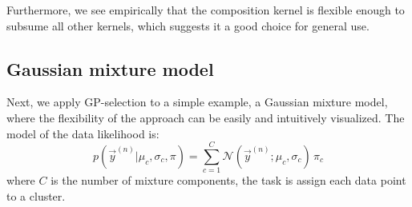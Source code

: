 
Furthermore, we see empirically that the composition kernel is flexible enough to subsume all other kernels, which suggests it a good choice  for general use. 


\subsection{Gaussian mixture model}
%
Next, we apply GP-selection to a simple example, a Gaussian mixture model, where the flexibility of the approach can be easily and intuitively visualized.
The model of the data likelihood is:
%
\vspace{-.2cm}
\begin{equation}\label{eq:mog}
p(\vec{y}^{(n)} | \mu_c, \sigma_c, \pi) = \sum_{c=1}^{C} \mathcal{N}(\vec{y}^{(n)}; \mu_c, \sigma_c) \, \pi_c
\end{equation}
%
where $C$ is the number of mixture components, the task is assign each data point to a cluster.
%

